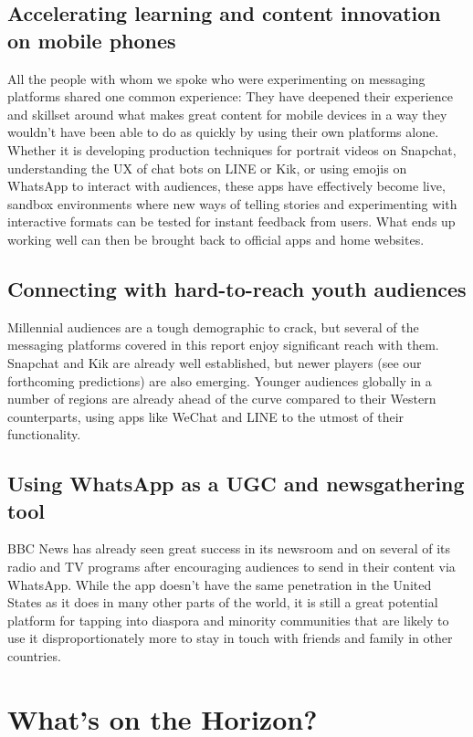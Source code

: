 \documentclass[notoc, symmetric, nobib, nols]{towcenter-guideto-book}
\begin{document}
\subsection{Accelerating learning and content innovation on mobile phones}
All the people with whom we spoke who were experimenting on messaging platforms shared one common experience: They have deepened their experience and skillset around what makes great content for mobile devices in a way they wouldn't have been able to do as quickly by using their own platforms alone. Whether it is developing production techniques for portrait videos on Snapchat, understanding the UX of chat bots on LINE or Kik, or using emojis on WhatsApp to interact with audiences, these apps have effectively become live, sandbox environments where new ways of telling stories and experimenting with interactive formats can be tested for instant feedback from users. What ends up working well can then be brought back to official apps and home websites.

\subsection{Connecting with hard-to-reach youth audiences}
Millennial audiences are a tough demographic to crack, but several of the messaging platforms covered in this report enjoy significant reach with them. Snapchat and Kik are already well established, but newer players (see our forthcoming predictions) are also emerging. Younger audiences globally in a number of regions are already ahead of the curve compared to their Western counterparts, using apps like WeChat and LINE to the utmost of their functionality. 

\subsection{Using WhatsApp as a UGC and newsgathering tool} 
BBC News has already seen great success in its newsroom and on several of its radio and TV programs after encouraging audiences to send in their content via WhatsApp. While the app doesn't have the same penetration in the United States as it does in many other parts of the world, it is still a great potential platform for tapping into diaspora and minority communities that are likely to use it disproportionately more to stay in touch with friends and family in other countries.

\section{What's on the Horizon?}
\end{document}
